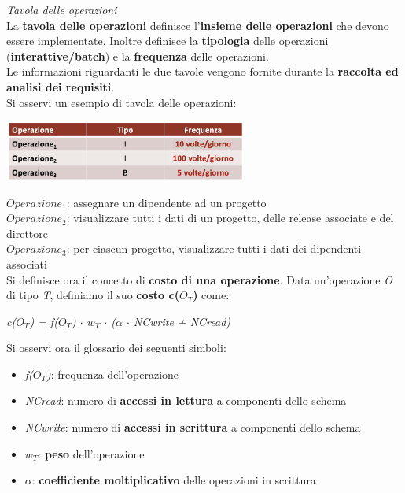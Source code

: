 \documentclass{article}
\begin{document}
\textit{Tavola delle operazioni}\\
La \textbf{tavola delle operazioni} definisce l'\textbf{insieme delle operazioni} che devono essere implementate. Inoltre definisce la \textbf{tipologia} delle operazioni (\textbf{interattive/batch}) e la \textbf{frequenza} delle operazioni. \\
Le informazioni riguardanti le due tavole vengono fornite durante la \textbf{raccolta ed analisi dei requisiti}.\vspace*{14pt}\\
Si osservi un esempio di tavola delle operazioni:
\begin{center}
    \includegraphics[width=0.6\textwidth]{foto 11.png}
\end{center}
\textbf{$Operazione_1$}: assegnare un dipendente ad un progetto\\
\textbf{$Operazione_2$}: visualizzare tutti i dati di un progetto, delle release associate e del direttore\\
\textbf{$Operazione_3$}: per ciascun progetto, visualizzare tutti i dati dei dipendenti associati\vspace{14pt}\\
Si definisce ora il concetto di \textbf{costo di una operazione}. Data un'operazione \textit{O} di tipo \textit{T}, definiamo il suo \textbf{costo c($O_T$)} come:\\
\begin{center}
    \textit{c($O_T$) = f($O_T$) $\cdot$ $w_T$ $\cdot$ ($\alpha$ $\cdot$ NCwrite + NCread)}\vspace{14pt}\\
\end{center}
Si osservi ora il glossario dei seguenti simboli:
\begin{itemize}[label={ }, leftmargin=1cm]
    \item \textit{f($O_T$)}: frequenza dell'operazione
    \item \textit{NCread}: numero di \textbf{accessi in lettura} a componenti dello schema
    \item \textit{NCwrite}: numero di \textbf{accessi in scrittura} a componenti dello schema
    \item \textit{$w_T$}: \textbf{peso} dell'operazione
    \item \textit{$\alpha$}: \textbf{coefficiente moltiplicativo} delle operazioni in scrittura\\
\end{itemize}
\end{document}
